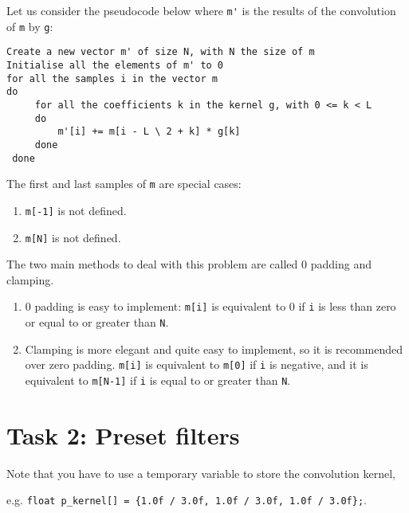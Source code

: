 \documentclass[english,a4paper,12pt,oneside]{article}
\begin{document}
Let us consider the pseudocode below where
\verb+m'+ is the results of the convolution of \verb+m+ by \verb+g+:





\begin{verbatim}
Create a new vector m' of size N, with N the size of m
Initialise all the elements of m' to 0
for all the samples i in the vector m
do
     for all the coefficients k in the kernel g, with 0 <= k < L
     do
         m'[i] += m[i - L \ 2 + k] * g[k]
     done
 done
\end{verbatim}

The first and last samples of \verb+m+ are special cases:
\begin{enumerate}
\item \verb+m[-1]+ is not defined.
\item \verb+m[N]+ is not defined.
\end{enumerate}

The two main methods to deal with this problem are called 0 padding and clamping. 
\begin{enumerate}
\item 0 padding is easy to implement: \verb+m[i]+ is equivalent to 0 if \verb+i+ is less than zero or equal to or greater than  \verb+N+. 
\item Clamping is more elegant and quite easy to implement, so it is recommended over zero padding. \verb+m[i]+ is equivalent to \verb+m[0]+ if \verb+i+ is negative, and it is equivalent to \verb+m[N-1]+ if \verb+i+ is equal to or greater than  \verb+N+. 
\end{enumerate}



\section*{Task 2: Preset filters}

Note that you have to use a temporary variable to store the convolution kernel, 

e.g. 
\verb+float p_kernel[] = {1.0f / 3.0f, 1.0f / 3.0f, 1.0f / 3.0f};+.
\end{document}
